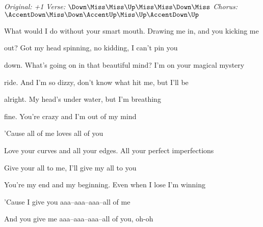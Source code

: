 \begin{song}


\begin{headerbox}
\RaiseBoxWithAccents
\textit{Original: +1} \quad
\textit{Verse:} $\Down\Miss\Miss\Up\Miss\Miss\Down\Miss$ \quad
\textit{Chorus:} $\AccentDown\Miss\Down\AccentUp\Miss\Up\AccentDown\Up$
\end{headerbox}

\begin{hchordbox}
\end{hchordbox}

\large

\bigskip

\Intro {}     \par

\bigskip

 What would I do without your smart mouth. Drawing me in, and you kicking me \par
{}out? Got my head spinning, no kidding, I can't pin you \par
{}down. What's going on in that beautiful mind? I'm on your magical mystery \par
{}ride. And I'm so dizzy, don't know what hit me, but I'll be \par

\bigskip

alright. My head's under water, but I'm breathing \par
{}fine. You're crazy and I'm out of my mind \par

\bigskip

'Cause all of me loves all of you \par
Love your curves and all your edges. All your perfect imperfections \par
Give your all to me, I'll give my all to you \par
You're my end and my beginning. Even when I lose I'm winning \par
'Cause I give you aaa–aaa–aaa–all of me   \par
And you give me aaa–aaa–aaa–all of you, oh-oh \par


\end{song}
